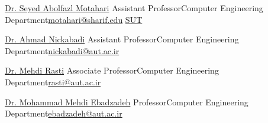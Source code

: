 
\newcommand{\refskip}{\enskip\cdotp\enskip}
\newcommand{\cesuffix}{{\refskip}Computer Engineering Department}

\begin{cvhonors}

  \cvref
    {\href{https://scholar.google.com/citations?user=rJ-biB0AAAAJ&hl=en}{Dr. Seyed Abolfazl Motahari}} %
    {Assistant Professor\cesuffix\refskip\href{mailto:motahari@sharif.edu}{motahari@sharif.edu}} %
    {\href{https://www.sharif.edu}{SUT}} %

  \cvref
    {\href{https://scholar.google.com/citations?user=pSMNSZwAAAAJ&hl=en}{Dr. Ahmad Nickabadi}} %
    {Assistant Professor\cesuffix\refskip\href{mailto:nickabadi@aut.ac.ir}{nickabadi@aut.ac.ir}} %
    {} %

  \cvref
    {\href{https://scholar.google.com/citations?user=zb8pjMYAAAAJ&hl=en}{Dr. Mehdi Rasti}} %
    {Associate Professor\cesuffix\refskip\href{mailto:rasti@aut.ac.ir}{rasti@aut.ac.ir}} %
    {} %

  \cvref
    {\href{https://scholar.google.com/citations?user=080Y\_lUAAAAJ&hl=en}{Dr. Mohammad Mehdi Ebadzadeh}} %
    {Professor\cesuffix\refskip\href{mailto:ebadzadeh@aut.ac.ir}{ebadzadeh@aut.ac.ir}} %
    {} %




\end{cvhonors}
